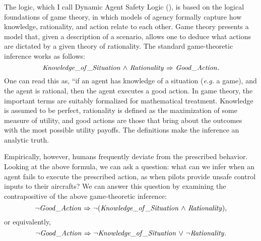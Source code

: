 
The logic, which I call Dynamic Agent Safety Logic (\DASL), is based on the logical foundations of game theory, in which models of agency formally capture how knowledge, rationality, and action relate to each other. Game theory presents a model that, given a description of a scenario, allows one to deduce what actions are dictated by a given theory of rationality. The standard game-theoretic inference works as follows:
\begin{equation*}
\mathit{Knowledge\_of\_Situation} {\ \wedge \ } \mathit{Rationality} {\ \Rightarrow \ } \mathit{Good\_Action}.
\end{equation*}
One can read this as, ``if an agent has knowledge of a situation (\emph{e.g.} a game), and the agent is rational, then the agent executes a good action. In game theory, the important terms are suitably formalized for mathematical treatment. Knowledge is assumed to be perfect, rationality is defined as the maximization of some measure of utility, and good actions are those that bring about the outcomes with the most possible utility payoffs. The definitions make the inference an analytic truth.

Empirically, however, humans frequently deviate from the prescribed behavior. Looking at the above formula, we can ask a question: what can we infer when an agent fails to execute the prescribed action, as when pilots provide unsafe control inputs to their aircrafts? We can answer this question by examining the contrapositive of the above game-theoretic inference:
\begin{equation*}
{\neg} \mathit{Good\_Action} {\ \Rightarrow \ } {\neg} (\mathit{Knowledge\_of\_Situation} {\ \wedge \ } \mathit{Rationality}),
\end{equation*}
or equivalently,
\begin{equation*}
{\neg} \mathit{Good\_Action} {\ \Rightarrow \ } {\neg} \mathit{Knowledge\_of\_Situation} {\ \vee \ } {\neg} \mathit{Rationality}.
\end{equation*}
 

